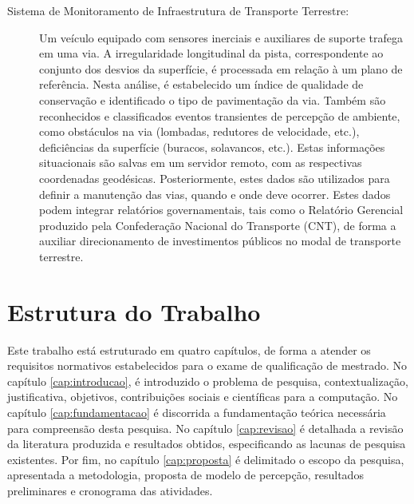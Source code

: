 \begin{description}
\item [Sistema de Monitoramento de Infraestrutura de Transporte Terrestre:] Um veículo equipado com sensores inerciais e auxiliares de suporte trafega em uma via. A irregularidade longitudinal da pista, correspondente ao conjunto dos desvios da superfície, é processada em relação à um plano de referência. Nesta análise, é estabelecido um índice de qualidade de conservação e identificado o tipo de pavimentação da via. Também são reconhecidos e classificados eventos transientes de percepção de ambiente, como obstáculos na via (lombadas, redutores de velocidade, etc.), deficiências da superfície (buracos, solavancos, etc.). Estas informações situacionais são salvas em um servidor remoto, com as respectivas coordenadas geodésicas. Posteriormente, estes dados são utilizados para definir a manutenção das vias, quando e onde deve ocorrer. Estes dados podem integrar relatórios governamentais, tais como o Relatório Gerencial produzido pela Confederação Nacional do Transporte (CNT), de forma a auxiliar direcionamento de investimentos públicos no modal de transporte terrestre.

\end{description}

\section{Estrutura do Trabalho}

Este trabalho está estruturado em quatro capítulos, de forma a atender os requisitos normativos estabelecidos para o exame de qualificação de mestrado. No capítulo \ref{cap:introducao}, é introduzido o problema de pesquisa, contextualização, justificativa, objetivos, contribuições sociais e científicas para a computação. No capítulo \ref{cap:fundamentacao} é discorrida a fundamentação teórica necessária para compreensão desta pesquisa. No capítulo \ref{cap:revisao} é detalhada a revisão da literatura produzida e resultados obtidos, especificando as lacunas de pesquisa existentes. Por fim, no capítulo \ref{cap:proposta} é delimitado o escopo da pesquisa, apresentada a metodologia, proposta de modelo de percepção, resultados preliminares e cronograma das atividades.
